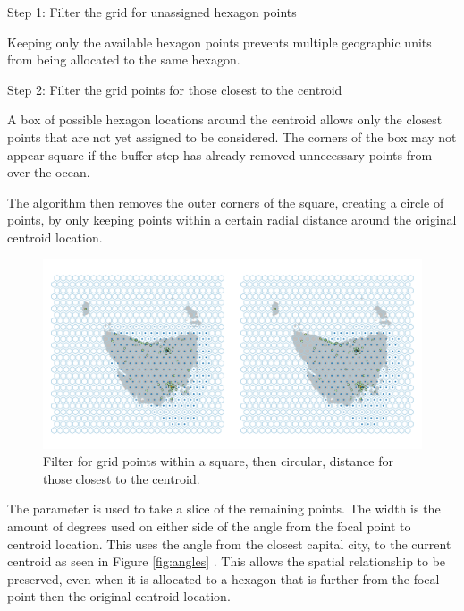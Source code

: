 \documentclass[
]{jss}
\begin{document}
Step 1: Filter the grid for unassigned hexagon points

Keeping only the available hexagon points prevents multiple geographic
units from being allocated to the same hexagon.

Step 2: Filter the grid points for those closest to the centroid

A box of possible hexagon locations around the centroid allows only the
closest points that are not yet assigned to be considered. The corners
of the box may not appear square if the buffer step has already removed
unnecessary points from over the ocean.

The algorithm then removes the outer corners of the square, creating a
circle of points, by only keeping points within a certain radial
distance around the original centroid location.

\begin{CodeChunk}
\begin{figure}

{\centering \includegraphics[width=1\linewidth]{figures/4grid} 

}

\caption[Filter for grid points within a square, then circular, distance for those closest to the centroid]{Filter for grid points within a square, then circular, distance for those closest to the centroid.}\label{fig:buffers}
\end{figure}
\end{CodeChunk}

The  parameter is used to take a slice of the remaining
points. The width is the amount of degrees used on either side of the
angle from the focal point to centroid location. This uses the angle
from the closest capital city, to the current centroid as seen in Figure
\ref{fig:angles} . This allows the spatial relationship to be preserved,
even when it is allocated to a hexagon that is further from the focal
point then the original centroid location.
\end{document}
